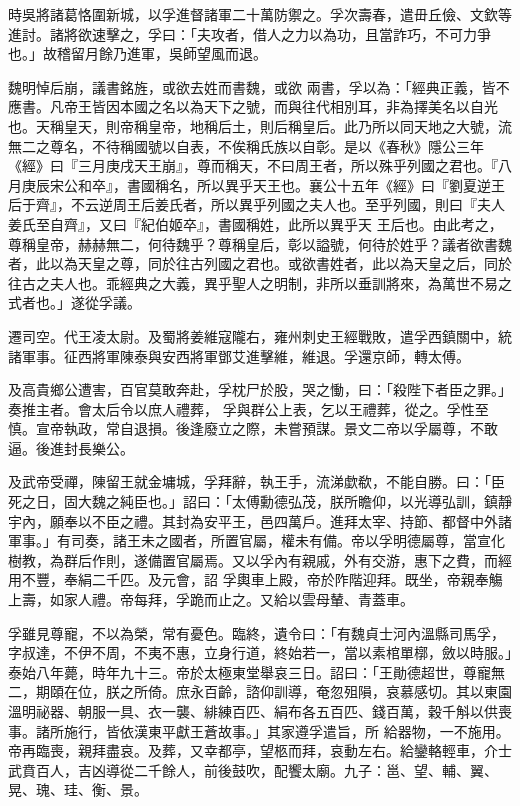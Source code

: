 \begin{pinyinscope}
 時吳將諸葛恪圍新城，以孚進督諸軍二十萬防禦之。孚次壽春，遣毌丘儉、文欽等進討。諸將欲速擊之，孚曰：「夫攻者，借人之力以為功，且當詐巧，不可力爭也。」故稽留月餘乃進軍，吳師望風而退。



 魏明悼后崩，議書銘旌，或欲去姓而書魏，或欲
 兩書，孚以為：「經典正義，皆不應書。凡帝王皆因本國之名以為天下之號，而與往代相別耳，非為擇美名以自光也。天稱皇天，則帝稱皇帝，地稱后土，則后稱皇后。此乃所以同天地之大號，流無二之尊名，不待稱國號以自表，不俟稱氏族以自彰。是以《春秋》隱公三年《經》曰『三月庚戌天王崩』，尊而稱天，不曰周王者，所以殊乎列國之君也。『八月庚辰宋公和卒』，書國稱名，所以異乎天王也。襄公十五年《經》曰『劉夏逆王后于齊』，不云逆周王后姜氏者，所以異乎列國之夫人也。至乎列國，則曰『夫人姜氏至自齊』，又曰『紀伯姬卒』，書國稱姓，此所以異乎天
 王后也。由此考之，尊稱皇帝，赫赫無二，何待魏乎？尊稱皇后，彰以謚號，何待於姓乎？議者欲書魏者，此以為天皇之尊，同於往古列國之君也。或欲書姓者，此以為天皇之后，同於往古之夫人也。乖經典之大義，異乎聖人之明制，非所以垂訓將來，為萬世不易之式者也。」遂從孚議。



 遷司空。代王凌太尉。及蜀將姜維寇隴右，雍州刺史王經戰敗，遣孚西鎮關中，統諸軍事。征西將軍陳泰與安西將軍鄧艾進擊維，維退。孚還京師，轉太傅。



 及高貴鄉公遭害，百官莫敢奔赴，孚枕尸於股，哭之慟，曰：「殺陛下者臣之罪。」奏推主者。會太后令以庶人禮葬，
 孚與群公上表，乞以王禮葬，從之。孚性至慎。宣帝執政，常自退損。後逢廢立之際，未嘗預謀。景文二帝以孚屬尊，不敢逼。後進封長樂公。



 及武帝受禪，陳留王就金墉城，孚拜辭，執王手，流涕歔欷，不能自勝。曰：「臣死之日，固大魏之純臣也。」詔曰：「太傅勳德弘茂，朕所瞻仰，以光導弘訓，鎮靜宇內，願奉以不臣之禮。其封為安平王，邑四萬戶。進拜太宰、持節、都督中外諸軍事。」有司奏，諸王未之國者，所置官屬，權未有備。帝以孚明德屬尊，當宣化樹教，為群后作則，遂備置官屬焉。又以孚內有親戚，外有交游，惠下之費，而經用不豐，奉絹二千匹。及元會，詔
 孚輿車上殿，帝於阼階迎拜。既坐，帝親奉觴上壽，如家人禮。帝每拜，孚跪而止之。又給以雲母輦、青蓋車。



 孚雖見尊寵，不以為榮，常有憂色。臨終，遺令曰：「有魏貞士河內溫縣司馬孚，字叔達，不伊不周，不夷不惠，立身行道，終始若一，當以素棺單槨，斂以時服。」泰始八年薨，時年九十三。帝於太極東堂舉哀三日。詔曰：「王勛德超世，尊寵無二，期頤在位，朕之所倚。庶永百齡，諮仰訓導，奄忽殂隕，哀慕感切。其以東園溫明祕器、朝服一具、衣一襲、緋練百匹、絹布各五百匹、錢百萬，穀千斛以供喪事。諸所施行，皆依漢東平獻王蒼故事。」其家遵孚遣旨，所
 給器物，一不施用。帝再臨喪，親拜盡哀。及葬，又幸都亭，望柩而拜，哀動左右。給鑾輅輕車，介士武賁百人，吉凶導從二千餘人，前後鼓吹，配饗太廟。九子：邕、望、輔、翼、晃、瑰、珪、衡、景。




\end{pinyinscope}
